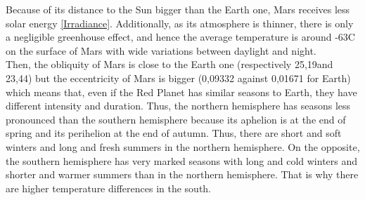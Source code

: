 \label{climate}
Because of its distance to the Sun bigger than the Earth one, Mars receives less solar energy \ref{Irradiance}. Additionally, as its atmosphere is thinner, there is only a negligible greenhouse effect, and hence the average temperature is around -63\textdegree C on the surface of Mars with wide variations between daylight and night. \\
Then, the obliquity of Mars is close to the Earth one (respectively 25,19\textdegree and 23,44\textdegree) but the eccentricity of Mars is bigger (0,09332 against 0,01671 for Earth) which means that, even if the Red Planet has similar seasons to Earth, they have different intensity and duration. Thus, the northern hemisphere has seasons less pronounced than the southern hemisphere because its aphelion is at the end of spring and its perihelion at the end of autumn. Thus, there are short and soft winters and long and fresh summers in the northern hemisphere. On the opposite, the southern hemisphere has very marked seasons with long and cold winters and shorter and warmer summers than in the northern hemisphere. That is why there are higher temperature differences in the south.